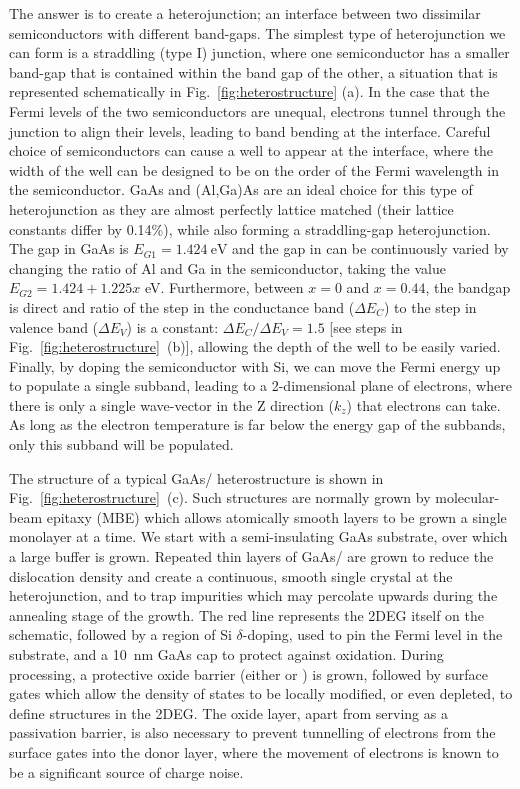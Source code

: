 The answer is to create a heterojunction; an interface between two dissimilar semiconductors with different band-gaps.
The simplest type of heterojunction we can form is a straddling (type I) junction, where one semiconductor has a smaller band-gap
that is contained within the band gap of the other, a situation that is represented schematically in Fig.~\ref{fig:heterostructure} (a).
In the case that the Fermi levels of the two semiconductors are unequal, electrons tunnel through the junction to align
their levels, leading to band bending at the interface. Careful choice of semiconductors can cause a well to appear at the interface,
where the width of the well can be designed to be on the order of the Fermi wavelength in the semiconductor. GaAs and (Al,Ga)As are
an ideal choice for this type of heterojunction as they are almost perfectly lattice matched (their lattice constants differ by 0.14\%),
while also forming a straddling-gap heterojunction. The gap in GaAs is $E_{G1} = \SI{1.424}{\electronvolt}$ and the gap in
 can be continuously varied by
changing the ratio of Al and Ga in the semiconductor, taking the value $E_{G2} = 1.424 + 1.225x$ \si{\electronvolt}.
Furthermore, between $x = 0$ and $x = 0.44$, the bandgap is direct and ratio of the step in the conductance
band ($\Delta E_C$) to the step in valence band ($\Delta E_V$) is a constant: $\Delta E_C/\Delta E_V = 1.5$\cite{adachi1993properties}
[see steps in Fig.~\ref{fig:heterostructure}~(b)], allowing the depth of the well to be easily varied.
Finally, by doping the semiconductor with Si, we can move the Fermi energy up to populate a single subband, leading to a
2-dimensional plane of electrons, where there is only a single wave-vector in the Z direction ($k_z$) that electrons can take. As long
as the electron temperature is far below the energy gap of the subbands, only this subband will be populated.

The structure of a typical GaAs/ heterostructure is shown in Fig.~\ref{fig:heterostructure}~(c). Such structures
are normally grown by molecular-beam epitaxy (MBE) which allows atomically smooth layers to be grown a single monolayer
at a time. We start with a semi-insulating GaAs substrate, over which a large buffer is grown.
Repeated thin layers of GaAs/ are grown to reduce the dislocation density
and create a continuous, smooth single crystal at the heterojunction, and to trap impurities which may percolate upwards
during the annealing stage of the growth. The red line represents the 2DEG itself on the schematic,
followed by a region of Si $\delta$-doping, used to pin the Fermi level in the substrate, and
a \SI{10}{\nano\meter} GaAs cap to protect against oxidation. During processing, a protective oxide barrier
(either  or ) is grown, followed by surface gates which allow the density of states to be locally modified, or even depleted,
to define structures in the 2DEG. The oxide layer, apart from serving as a passivation barrier, is also necessary to
prevent tunnelling of electrons from the surface gates into the donor layer, where the movement of electrons is known to be a significant
source of charge noise\cite{PhysRevB.72.115331, PhysRevApplied.9.034008}.

